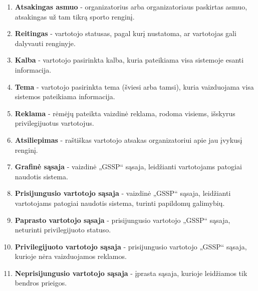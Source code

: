 \documentclass{VUMIFPSkursinis}
\begin{document}
\begin{enumerate}[label=\textbf{E\arabic*.}]
				\item \textbf{Atsakingas asmuo} - organizatorius arba organizatoriaus paskirtas asmuo, atsakingas už tam tikrą sporto renginį.
				\item \textbf{Reitingas} - vartotojo statusas, pagal kurį nustatoma, ar vartotojas gali dalyvauti renginyje.
				\item \textbf{Kalba} - vartotojo pasirinkta kalba, kuria pateikiama visa sistemoje esanti informacija.
				\item \textbf{Tema} - vartotojo pasirinkta tema (šviesi arba tamsi), kuria vaizduojama visa sistemos pateikiama informacija.
				\item \textbf{Reklama} - rėmėjų pateikta vaizdinė reklama, rodoma visiems, išskyrus privilegijuotus vartotojus.
				\item \textbf{Atsiliepimas} - raštiškas vartotojo atsakas organizatoriui apie jau įvykusį renginį.
				\item \textbf{Grafinė sąsaja} - vaizdinė „GSSP“ sąsaja, leidžianti vartotojams patogiai naudotis sistema.
				\item \textbf{Prisijungusio vartotojo sąsaja} - vaizdinė „GSSP“ sąsaja, leidžianti vartotojams patogiai naudotis sistema, turinti papildomų galimybių.
				\item \textbf{Paprasto vartotojo sąsaja} - prisijungusio vartotojo „GSSP“ sąsaja, neturinti privilegijuoto statuso.
				\item \textbf{Privilegijuoto vartotojo sąsaja} - prisijungusio vartotojo „GSSP“ sąsaja, kurioje nėra vaizduojamos reklamos.
				\item \textbf{Neprisijungusio vartotojo sąsaja} - įprasta sąsaja, kurioje leidžiamos tik bendros prieigos.
				
            \end{enumerate}
\end{document}
